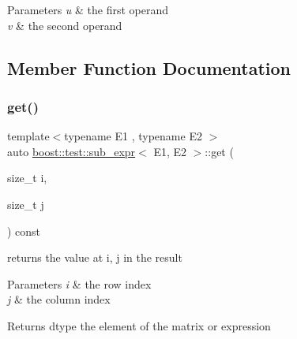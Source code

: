 \begin{DoxyParams}{Parameters}
{\em u} & the first operand \\
\hline
{\em v} & the second operand \\
\hline
\end{DoxyParams}


\subsection{Member Function Documentation}
\mbox{\label{classboost_1_1test_1_1sub__expr_ae60478e21c0164c46a0edda336381887}} 
\subsubsection{\texorpdfstring{get()}{get()}}
{\footnotesize\ttfamily template$<$typename E1 , typename E2 $>$ \\
auto \mbox{\hyperlink{classboost_1_1test_1_1sub__expr}{boost\+::test\+::sub\+\_\+expr}}$<$ E1, E2 $>$\+::get (\begin{DoxyParamCaption}\item[{size\+\_\+t}]{i,  }\item[{size\+\_\+t}]{j }\end{DoxyParamCaption}) const\hspace{0.3cm}{\ttfamily [inline]}}



returns the value at i, j in the result 


\begin{DoxyParams}{Parameters}
{\em i} & the row index \\
\hline
{\em j} & the column index \\
\hline
\end{DoxyParams}
\begin{DoxyReturn}{Returns}
dtype the element of the matrix or expression 
\end{DoxyReturn}
\mbox{\label{classboost_1_1test_1_1sub__expr_ad9223a7c52f0503f416c5805994f2652}} 
